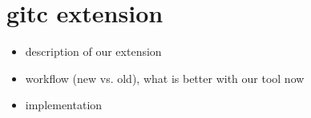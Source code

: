 \section{gitc extension}
\label{sec:Extension}

\begin{itemize}
	\item description of our extension
	\item workflow (new vs. old), what is better with our tool now
	\item implementation
\end{itemize}